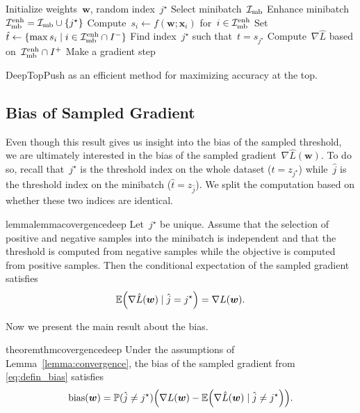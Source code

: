 \begin{algorithm}[H]
  \centering
  \begin{algorithmic}[1]
    \State Initialize weights~$\bm{w}$, random index~$j^{\star}$
    \Repeat
    \State Select minibatch~$\mathcal{I}_{\text{mb}}$
    \State Enhance minibatch~$\mathcal{I}_{\text{mb}}^{\text{enh}} = \mathcal{I}_{\text{mb}} \cup \{j^{\star}\}$
    \State Compute~$s_i \gets f(\bm{w};\bm{x}_i)$ for~$i\in\mathcal{I}_{\text{mb}}^{\text{enh}}$
    \State Set~$\hat{t} \gets \{\max s_i \mid i \in \mathcal{I}_{\text{mb}}^{\text{enh}} \cap I^-\}$
    \State Find index~$j^{\star}$ such that~$t = s_{j^{\star}}$
    \State Compute~$\nabla \hat{L}$ based on~$\mathcal{I}_{\text{mb}}^{\text{enh}} \cap I^+$
    \State Make a gradient step
  \end{algorithmic}
  \caption{DeepTopPush as an efficient method for maximizing accuracy at the top.}
  \label{alg2}
\end{algorithm}

\subsection{Bias of Sampled Gradient}

Even though this result gives us insight into the bias of the sampled threshold, we are ultimately interested in the bias of the sampled gradient~$\nabla \hat{L}(\bm{w})$. To do so, recall that~$j^{\star}$ is the threshold index on the whole dataset ($t=z_{j^{\star}}$) while~$\hat j$ is the threshold index on the minibatch ($\hat{t}=z_{\hat j}$). We split the computation based on whether these two indices are identical.

\begin{restatable}{lemma}{lemmacovergencedeep}\label{lemma:convergence}
  Let~$j^{\star}$ be unique. Assume that the selection of positive and negative samples into the minibatch is independent and that the threshold is computed from negative samples while the objective is computed from positive samples. Then the conditional expectation of the sampled gradient satisfies
  \begin{equation*}
    \EE\Brac{\nabla \hat{L}(\bm{w}) \mid \hat j=j^{\star}} =  \nabla L(\bm{w}).
  \end{equation*}
\end{restatable}

Now we present the main result about the bias.

\begin{restatable}{theorem}{thmcovergencedeep}\label{theorem:convergence}
  Under the assumptions of Lemma~\ref{lemma:convergence}, the bias of the sampled gradient from \eqref{eq:defin_bias} satisfies
  \begin{equation}\label{eq:comp_bias}
    \bias(\bm{w}) = \PP(\hat j\neq j^{\star}) \Brac{\nabla L(\bm{w}) - \EE\Brac{\nabla \hat{L}(\bm{w}) \mid \hat j\neq j^{\star}}}.
  \end{equation}
\end{restatable}

